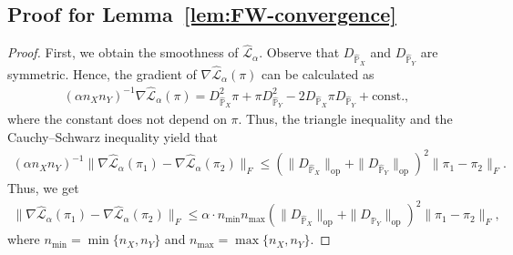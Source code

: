 \documentclass{article}
\theoremstyle{plain}
\theoremstyle{definition}
\theoremstyle{remark}
\begin{document}
\subsection{Proof for Lemma~\ref{lem:FW-convergence}}\label{pf:lem:FW-convergence}
\begin{proof}
	First, we obtain the smoothness of $\hat{\mathcal{L}}_{\alpha}$. Observe that $D_{\hat{\mathbb{P}}_X}$ and $D_{\hat{\mathbb{P}}_Y}$ are symmetric. Hence, the gradient of $\nabla \hat{\mathcal{L}}_{\alpha}(\pi)$ can be calculated as
	\begin{align*}
		(\alpha n_Xn_Y)^{-1}\nabla \hat{\mathcal{L}}_{\alpha}(\pi) = D_{\hat{\mathbb{P}}_X}^2\pi + \pi D_{\hat{\mathbb{P}}_Y}^2 - 2D_{\hat{\mathbb{P}}_X} \pi D_{\hat{\mathbb{P}}_Y} + \mathrm{const.} ,
	\end{align*}
	where the constant does not depend on $\pi$. Thus, the triangle inequality and the Cauchy--Schwarz inequality yield that
	\begin{align*}
		(\alpha n_Xn_Y)^{-1} \Big\| \nabla \hat{\mathcal{L}}_{\alpha}(\pi_1) - \nabla \hat{\mathcal{L}}_{\alpha}(\pi_2) \Big\|_F \leq \left(\|D_{\hat{\mathbb{P}}_X}\|_{\mathrm{op}} + \|D_{\hat{\mathbb{P}}_Y}\|_{\mathrm{op}}\right)^2\| \pi_1 - \pi_2 \|_F .
	\end{align*}
	Thus, we get
	\begin{align}
		\label{eq:beta-smooth}
		\Big\| \nabla \hat{\mathcal{L}}_{\alpha}(\pi_1) - \nabla \hat{\mathcal{L}}_{\alpha}(\pi_2) \Big\|_F \leq \alpha \cdot n_{\min}n_{\max} \left(\|D_{\hat{\mathbb{P}}_X}\|_{\mathrm{op}} + \|D_{\hat{\mathbb{P}}_Y}\|_{\mathrm{op}}\right)^2 \|\pi_1 - \pi_2\|_F ,
	\end{align}
	where $n_{\min} = \min\{n_X,n_Y\}$ and $n_{\max} = \max\{n_X,n_Y\}$.
	

\end{proof}
\end{document}
